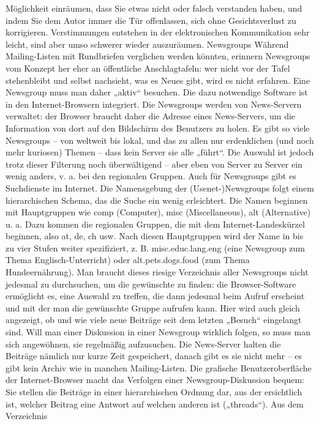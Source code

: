 \documentclass[]{book}
\theoremstyle{definition}
\theoremstyle{definition}
\theoremstyle{definition}
\theoremstyle{remark}
\begin{document}
Möglichkeit einräumen, dass Sie etwas nicht oder falsch verstanden
haben, und indem Sie dem Autor immer die Tür offenlassen, sich ohne
Gesichtsverlust zu korrigieren. Verstimmungen entstehen in der
elektronischen Kommunikation sehr leicht, sind aber umso schwerer wieder
auszuräumen. Newsgroups Während Mailing-Listen mit Rundbriefen
verglichen werden könnten, erinnern Newsgroups vom Konzept her eher an
öffentliche Anschlagtafeln: wer nicht vor der Tafel stehenbleibt und
selbst nachsieht, was es Neues gibt, wird es nicht erfahren. Eine
Newsgroup muss man daher „aktiv`` besuchen. Die dazu notwendige Software
ist in den Internet-Browsern integriert. Die Newsgroups werden von
News-Servern verwaltet: der Browser braucht daher die Adresse eines
News-Servers, um die Information von dort auf den Bildschirm des
Benutzers zu holen. Es gibt so viele Newsgroups -- von weltweit bis
lokal, und das zu allen nur erdenklichen (und noch mehr kuriosen) Themen
-- dass kein Server sie alle „führt``. Die Auswahl ist jedoch trotz
dieser Filterung noch überwältigend -- aber eben von Server zu Server
ein wenig anders, v. a. bei den regionalen Gruppen. Auch für Newsgroups
gibt es Suchdienste im Internet. Die Namensgebung der
(Usenet-)Newsgroups folgt einem hierarchischen Schema, das die Suche ein
wenig erleichtert. Die Namen beginnen mit Hauptgruppen wie comp
(Computer), misc (Miscellaneous), alt (Alternative) u. a. Dazu kommen
die regionalen Gruppen, die mit dem Internet-Landeskürzel beginnen, also
at, de, ch usw. Nach diesen Hauptgruppen wird der Name in bis zu vier
Stufen weiter spezifiziert, z. B. misc.educ.lang.eng (eine Newsgroup zum
Thema Englisch-Unterricht) oder alt.pets.dogs.food (zum Thema
Hundeernährung). Man braucht dieses riesige Verzeichnis aller Newsgroups
nicht jedesmal zu durchsuchen, um die gewünschte zu finden: die
Browser-Software ermöglicht es, eine Auswahl zu treffen, die dann
jedesmal beim Aufruf erscheint und mit der man die gewünschte Gruppe
aufrufen kann. Hier wird auch gleich angezeigt, ob und wie viele neue
Beiträge seit dem letzten „Besuch`` eingelangt sind. Will man einer
Diskussion in einer Newsgroup wirklich folgen, so muss man sich
angewöhnen, sie regelmäßig aufzusuchen. Die News-Server halten die
Beiträge nämlich nur kurze Zeit gespeichert, danach gibt es sie nicht
mehr -- es gibt kein Archiv wie in manchen Mailing-Listen. Die grafische
Benutzeroberfläche der Internet-Browser macht das Verfolgen einer
Newsgroup-Diskussion bequem: Sie stellen die Beiträge in einer
hierarchischen Ordnung dar, aus der ersichtlich ist, welcher Beitrag
eine Antwort auf welchen anderen ist („threads``). Aus dem Verzeichnis
\end{document}
